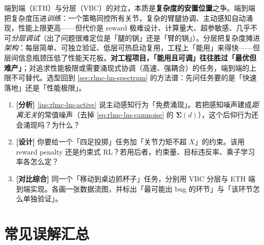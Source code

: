 \begin{insight}\label{ins:rlmc-lm-e2e-vs-hier}
端到端（ETH）与分层（VBC）的对立，本质是\textbf{复杂度的安置位置}之争。端到端把复杂度压进\emph{训练}：一个策略同控所有关节，复杂的臂腿协调、主动感知自动涌现，性能上限更高——但代价是 reward 极难设计、计算量大、超参敏感、几乎不可\emph{分层调试}（出了问题很难定位是「腿的锅」还是「臂的锅」）。分层把复杂度摊进\emph{架构}：每层简单、可独立验证、低层可热启动复用，工程上「能用」来得快——但层间信息瓶颈压低了性能天花板。\textbf{对工程项目，「能用且可调」往往胜过「最优但难产」}；对追求性能极限或需要涌现式协调（高速、强耦合）的任务，端到端的上限不可替代。选型回到 \cref{sec:rlmc-lm-spectrum} 的方法谱：先问任务要的是「快速落地」还是「性能极限」。
\end{insight}

\begin{practice}[练习·ETH 精读]
\begin{enumerate}
\item \textbf{[分析]} \cref{ins:rlmc-lm-active} 说主动感知行为「免费涌现」。若把感知噪声建成\emph{距离无关}的常值噪声（去掉 \cref{eq:rlmc-lm-camnoise} 的 $\boldsymbol\Sigma(d)$），这个后仰行为还会涌现吗？为什么？
\item \textbf{[设计]} 你要给一个「四足投掷」任务加「关节力矩不超 $X$」的约束。该用 reward penalty 还是约束式 RL？若用后者，约束量、目标违反率、乘子学习率各怎么定？
\item \textbf{[对比综合]} 同一个「移动到桌边抓杯子」任务，分别用 VBC 分层与 ETH 端到端实现。各画一张数据流图，并标出「最可能出 bug 的环节」与「该环节怎么单独验证」。
\end{enumerate}
\end{practice}

\section{常见误解汇总}
\label{sec:rlmc-lm-myths}

